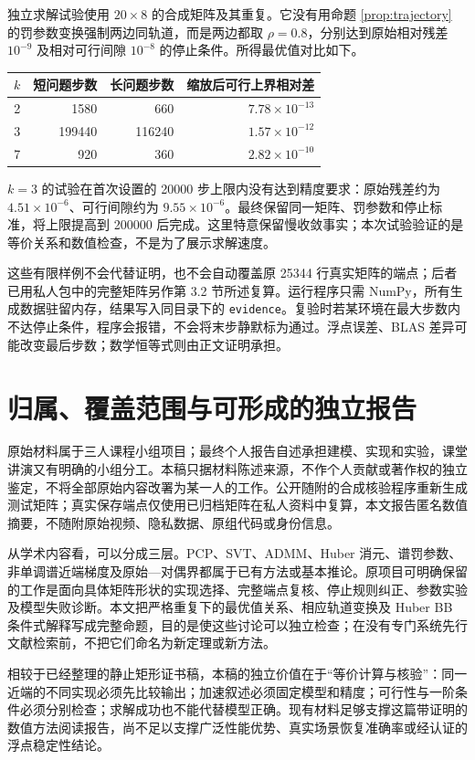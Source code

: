 \documentclass[UTF8,fontset=none,zihao=-4,a4paper]{ctexart}
\theoremstyle{plainzh}
\numberwithin{equation}{section}
\begin{document}
独立求解试验使用 $20\times8$ 的合成矩阵及其重复。它没有用命题 \ref{prop:trajectory} 的罚参数变换强制两边同轨道，而是两边都取 $\rho=0.8$，分别达到原始相对残差 $10^{-9}$ 及相对可行间隙 $10^{-8}$ 的停止条件。所得最优值对比如下。
\begin{center}
\begin{tabular}{rrrr}
\toprule
$k$ & 短问题步数 & 长问题步数 & 缩放后可行上界相对差\\
\midrule
2 &1580&660&$7.78\times10^{-13}$\\
3 &199440&116240&$1.57\times10^{-12}$\\
7 &920&360&$2.82\times10^{-10}$\\
\bottomrule
\end{tabular}
\end{center}
$k=3$ 的试验在首次设置的 20000 步上限内没有达到精度要求：原始残差约为 $4.51\times10^{-6}$、可行间隙约为 $9.55\times10^{-6}$。最终保留同一矩阵、罚参数和停止标准，将上限提高到 200000 后完成。这里特意保留慢收敛事实；本次试验验证的是等价关系和数值检查，不是为了展示求解速度。

这些有限样例不会代替证明，也不会自动覆盖原 25344 行真实矩阵的端点；后者已用私人包中的完整矩阵另作第 3.2 节所述复算。运行程序只需 NumPy，所有生成数据驻留内存，结果写入同目录下的 \texttt{evidence}。复验时若某环境在最大步数内不达停止条件，程序会报错，不会将末步静默标为通过。浮点误差、BLAS 差异可能改变最后步数；数学恒等式则由正文证明承担。

\section{归属、覆盖范围与可形成的独立报告}
原始材料属于三人课程小组项目；最终个人报告自述承担建模、实现和实验，课堂讲演又有明确的小组分工。本稿只据材料陈述来源，不作个人贡献或著作权的独立鉴定，不将全部原始内容改署为某一人的工作。公开随附的合成核验程序重新生成测试矩阵；真实保存端点仅使用已归档矩阵在私人资料中复算，本文报告匿名数值摘要，不随附原始视频、隐私数据、原组代码或身份信息。

从学术内容看，可以分成三层。PCP、SVT、ADMM、Huber 消元、谱罚参数、非单调谱近端梯度及原始—对偶界都属于已有方法或基本推论。原项目可明确保留的工作是面向具体矩阵形状的实现选择、完整端点复核、停止规则纠正、参数实验及模型失败诊断。本文把严格重复下的最优值关系、相应轨道变换及 Huber BB 条件式解释写成完整命题，目的是使这些讨论可以独立检查；在没有专门系统先行文献检索前，不把它们命名为新定理或新方法。

相较于已经整理的静止矩形证书稿，本稿的独立价值在于“等价计算与核验”：同一近端的不同实现必须先比较输出；加速叙述必须固定模型和精度；可行性与一阶条件必须分别检查；求解成功也不能代替模型正确。现有材料足够支撑这篇带证明的数值方法阅读报告，尚不足以支撑广泛性能优势、真实场景恢复准确率或经认证的浮点稳定性结论。
\end{document}
